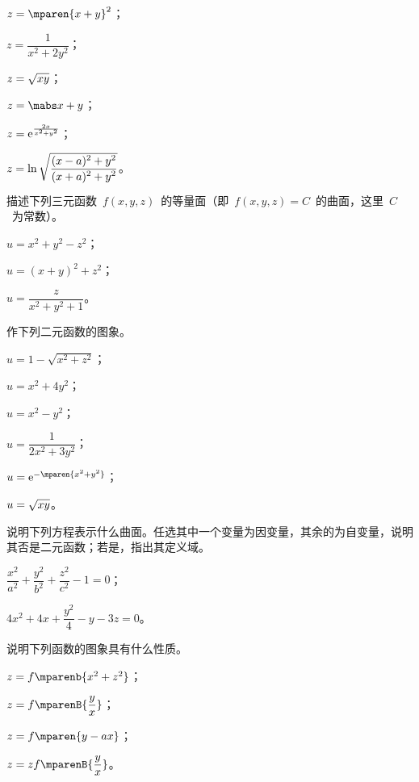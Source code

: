 \begin{exercise}
\begin{exlistcols}[3]
\item $z=\mparen{x+y}^2$；
\item $z=\dfrac1{x^2+2y^2}$；
\item $z=\smbsqrt{xy}$；
\item $z=\mabs x+y$；
\item $z=\mathrm e^{\frac{2x}{x^2+y^2}}$；
\item $z=\ln\sqrt{\dfrac{(x-a)^2+y^2}{\smash[b]{(x+a)^2+y^2}}}$。
\end{exlistcols}
\item 描述下列三元函数~$f(x,y,z)$~的等量面（即~$f(x,y,z)=C$~的曲面，这里~$C$~为常数）。
\begin{exlistcols}[3]
  \item $u=x^2+y^2-z^2$；
  \item $u=(x+y)^2+z^2$；
  \item $u=\dfrac z{x^2+y^2+1}$。
\end{exlistcols}
\item 作下列二元函数的图象。
\begin{exlistcols}[3]
  \item $u=1-\sqrt{x^2+z^2}$；
  \item $u=x^2+4y^2$；
  \item $u=x^2-y^2$；
  \item $u=\dfrac1{2x^2+3y^2}$；
  \item $u=\me^{-\mparen{x^2+y^2}}$；
  \item $u=\smbsqrt{xy}$。
\end{exlistcols}
\item 说明下列方程表示什么曲面。任选其中一个变量为因变量，其余的为自变量，说明其否是二元函数；若是，指出其定义域。
\begin{exlistcols}
  \item $\dfrac{x^2}{a^2}+\dfrac{y^2}{b^2}+\dfrac{z^2}{c^2}-1=0$；
  \item $4x^2+4x+\dfrac{y^2}4-y-3z=0$。
\end{exlistcols}
\item 说明下列函数的图象具有什么性质。
\begin{exlistcols}[4]
  \item $z=f\mparenb{x^2+z^2}$；
  \item $z=f\mparenB{\dfrac yx}$；
  \item $z=f\mparen{y-ax}$；
  \item $z=zf\mparenB{\dfrac yx}$。
\end{exlistcols}
\end{exercise}

